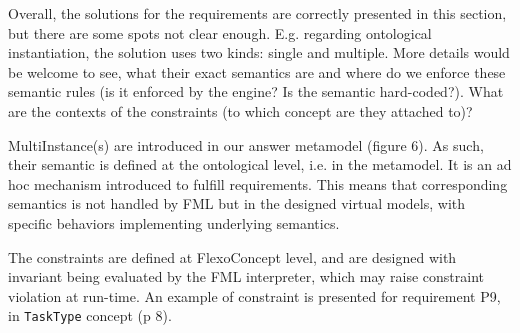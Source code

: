 \documentclass[10pt]{article}
\begin{document}
\begin{response}{Overall, the solutions for the requirements are correctly presented in this section, but there are some spots not clear enough. E.g. regarding ontological instantiation, the solution uses two kinds: single and multiple. More details would be welcome to see, what their exact semantics are and where do we enforce these semantic rules (is it enforced by the engine? Is the semantic hard-coded?). What are the contexts of the constraints (to which concept are they attached to)?}


MultiInstance(s) are introduced in our answer metamodel (figure 6). As such, their semantic is defined at the ontological level, i.e. in the metamodel. It is an ad hoc mechanism introduced to fulfill requirements. This means that corresponding semantics is not handled by FML but in the designed virtual models, with specific behaviors implementing underlying semantics.%


The constraints are defined at FlexoConcept level, and are designed with invariant being evaluated by the FML interpreter, which may raise constraint violation at run-time. An example of constraint is presented for requirement P9, in \texttt{TaskType} concept (p 8).

\end{response}
\end{document}
